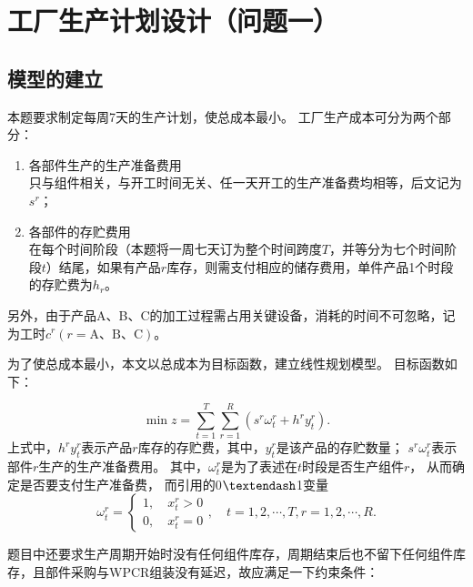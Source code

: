 \section{工厂生产计划设计（问题一）} %
\label{sec:工厂生产计划设计_问题一_}

\subsection{模型的建立} %
\label{sub:模型的建立}

本题要求制定每周7天的生产计划，使总成本最小。
工厂生产成本可分为两个部分：
\begin{enumerate}
	\item 各部件生产的生产准备费用\\
只与组件相关，与开工时间无关、任一天开工的生产准备费均相等，后文记为$s^r$；
	\item 各部件的存贮费用\\
在每个时间阶段（本题将一周七天订为整个时间跨度$T$，并等分为七个时间阶段$t$）结尾，如果有产品$r$库存，则需支付相应的储存费用，单件产品1个时段的存贮费为$h_r$。
\end{enumerate}
另外，由于产品A、B、C的加工过程需占用关键设备，消耗的时间不可忽略，记为工时$c^r(r=\text{A、B、C})$。

为了使总成本最小，本文以总成本为目标函数，建立线性规划模型。
目标函数如下：

\begin{equation}
	\min z=\sum_{t=1}^{T} \sum_{r=1}^{R}\left(s^{r} \omega_{t}^{r}+h^{r} y_{t}^{r}\right).
\end{equation}
上式中，$h^{r} y_{t}^{r}$表示产品$r$库存的存贮费，其中，$y_{t}^{r}$是该产品的存贮数量；
$s^{r} \omega_{t}^{r}$表示部件$r$生产的生产准备费用。
其中，$\omega_{t}^{r}$是为了表述在$t$时段是否生产组件$r$， 从而确定是否要支付生产准备费， 而引用的0$\textendash$1变量
\begin{equation}
	\omega_{t}^{r}=\left\{\begin{array}{l}
1, \quad x_{t}^{r}>0 \\
0, \quad x_{t}^{r}=0
\end{array},\quad t=1,2, \cdots, T, r=1,2, \cdots, R.\right.
\end{equation}

题目中还要求生产周期开始时没有任何组件库存，周期结束后也不留下任何组件库存，且部件采购与WPCR组装没有延迟，故应满足一下约束条件：

